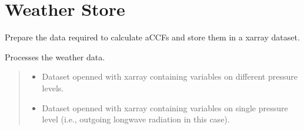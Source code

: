 \documentclass[a4paper,11pt,english]{sphinxmanual}
\begin{document}
\section{Weather Store}
\label{\detokenize{modules:weather-store}}

\begin{fulllineitems}
\label{\detokenize{modules:envlib.weather_store.WeatherStore}}
\pysigstartsignatures
{}
\pysigstopsignatures
\sphinxAtStartPar
Prepare the data required to calculate aCCFs and store them in a xarray dataset.

\begin{fulllineitems}
\label{\detokenize{modules:envlib.weather_store.WeatherStore.__init__}}
\pysigstartsignatures
{}
\pysigstopsignatures
\sphinxAtStartPar
Processes the weather data.
\begin{quote}\begin{description}
\begin{itemize}
\item {} 
\sphinxAtStartPar
{} \textendash{} Dataset openned with xarray containing variables on different pressure levels.

\item {} 
\sphinxAtStartPar
{} \textendash{} Dataset openned with xarray containing variables on single pressure level (i.e., outgoing longwave radiation in this case).


\end{itemize}
\end{description}
\end{quote}
\end{fulllineitems}
\end{fulllineitems}
\end{document}
